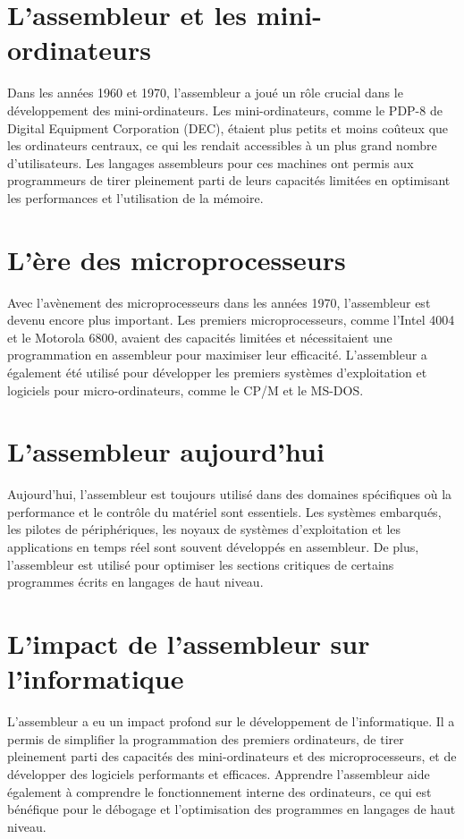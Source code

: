 \documentclass[a4paper, 12pt]{report}
\begin{document}
\section{L'assembleur et les mini-ordinateurs}
Dans les années 1960 et 1970, l'assembleur a joué un rôle crucial dans le développement des mini-ordinateurs. Les mini-ordinateurs, comme le PDP-8 de Digital Equipment Corporation (DEC), étaient plus petits et moins coûteux que les ordinateurs centraux, ce qui les rendait accessibles à un plus grand nombre d'utilisateurs. Les langages assembleurs pour ces machines ont permis aux programmeurs de tirer pleinement parti de leurs capacités limitées en optimisant les performances et l'utilisation de la mémoire.

\section{L'ère des microprocesseurs}
Avec l'avènement des microprocesseurs dans les années 1970, l'assembleur est devenu encore plus important. Les premiers microprocesseurs, comme l'Intel 4004 et le Motorola 6800, avaient des capacités limitées et nécessitaient une programmation en assembleur pour maximiser leur efficacité. L'assembleur a également été utilisé pour développer les premiers systèmes d'exploitation et logiciels pour micro-ordinateurs, comme le CP/M et le MS-DOS.

\section{L'assembleur aujourd'hui}
Aujourd'hui, l'assembleur est toujours utilisé dans des domaines spécifiques où la performance et le contrôle du matériel sont essentiels. Les systèmes embarqués, les pilotes de périphériques, les noyaux de systèmes d'exploitation et les applications en temps réel sont souvent développés en assembleur. De plus, l'assembleur est utilisé pour optimiser les sections critiques de certains programmes écrits en langages de haut niveau.

\section{L'impact de l'assembleur sur l'informatique}
L'assembleur a eu un impact profond sur le développement de l'informatique. Il a permis de simplifier la programmation des premiers ordinateurs, de tirer pleinement parti des capacités des mini-ordinateurs et des microprocesseurs, et de développer des logiciels performants et efficaces. Apprendre l'assembleur aide également à comprendre le fonctionnement interne des ordinateurs, ce qui est bénéfique pour le débogage et l'optimisation des programmes en langages de haut niveau.
\end{document}
